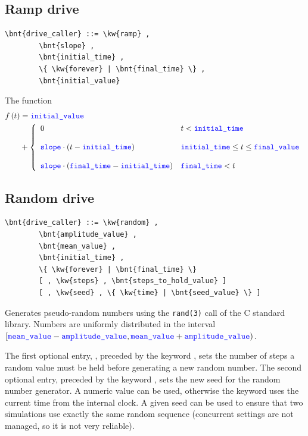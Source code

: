 \subsection{Ramp drive}
\begin{Verbatim}[commandchars=\\\{\}]
    \bnt{drive_caller} ::= \kw{ramp} ,
        \bnt{slope} , 
        \bnt{initial_time} ,
        \{ \kw{forever} | \bnt{final_time} \} ,
        \bnt{initial_value}
\end{Verbatim}
The function
\begin{align}
	f\plbr{t} &= \nt{initial\_value} \nonumber \\
	&+ \lcubr{\matr{ll}{
		0
			& t < \nt{initial\_time} \\
		\\
		\nt{slope} \cdot \plbr{t - \nt{initial\_time}}
			& \nt{initial\_time} \le t \le \nt{final\_value} \\
		\\
		\nt{slope} \cdot \plbr{\nt{final\_time} - \nt{initial\_time}}
			& \nt{final\_time} < t
	}}
\end{align}

\subsection{Random drive}
\begin{Verbatim}[commandchars=\\\{\}]
    \bnt{drive_caller} ::= \kw{random} ,
        \bnt{amplitude_value} ,
        \bnt{mean_value} ,
        \bnt{initial_time} ,
        \{ \kw{forever} | \bnt{final_time} \}
        [ , \kw{steps} , \bnt{steps_to_hold_value} ]
        [ , \kw{seed} , \{ \kw{time} | \bnt{seed_value} \} ]
\end{Verbatim}
Generates pseudo-random numbers using the \texttt{rand(3)} call
of the C standard library.
Numbers are uniformly distributed in the interval
$[\nt{mean\_value} - \nt{amplitude\_value}, \nt{mean\_value} + \nt{amplitude\_value})$.

The first optional entry, ,
preceded by the keyword , sets the
number of steps a random value must be held before generating a new
random number.
The second optional entry, preceded by the keyword
, sets the new seed for the random number generator.
A numeric  value can be used,
otherwise the keyword  uses the current time from
the internal clock.
A given seed can be used to ensure that two
simulations use exactly the same random sequence (concurrent settings 
are not managed, so it is not very reliable).

